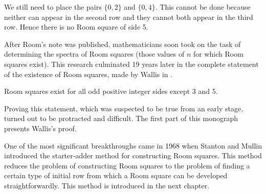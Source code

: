We still need to place the pairs $\{0, 2\}$ and $\{0, 4\}$.
This cannot be done because neither can appear in the second row and they cannot both appear in the third row.
Hence there is no Room square of side 5.

After Room's note was published, mathematicians soon took on the task of determining the spectra of Room squares (those values of $n$ for which Room squares exist).
This research culminated 19 years later in the complete statement of the existence of Room squares, made by Wallis in \cite{wallisSolutionRoomSquare1974}.

\begin{theorem}
Room squares exist for all odd positive integer sides except 3 and 5.
\end{theorem}

Proving this statement, which was suspected to be true from an early stage, turned out to be protracted and difficult.
The first part of this monograph presents Wallis's proof.

One of the most significant breakthroughs came in 1968 when Stanton and Mullin introduced the starter-adder method for constructing Room squares.
This method reduces the problem of constructing Room squares to the problem of finding a certain type of initial row from which a Room square can be developed straightforwardly.
This method is introduced in the next chapter.

